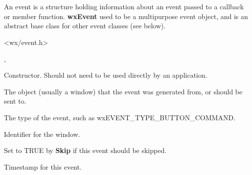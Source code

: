 \section{}\label{wxevent}

An event is a structure holding information about an event passed to a
callback or member function. {\bf wxEvent} used to be a multipurpose
event object, and is an abstract base class for other event classes (see below).




<wx/event.h>


,\rtfsp
{}




Constructor. Should not need to be used directly by an application.



The object (usually a window) that the event was generated from,
or should be sent to.



The type of the event, such as wxEVENT\_TYPE\_BUTTON\_COMMAND.



Identifier for the window.



Set to TRUE by {\bf Skip} if this event should be skipped.



Timestamp for this event.

\label{wxeventclone}

